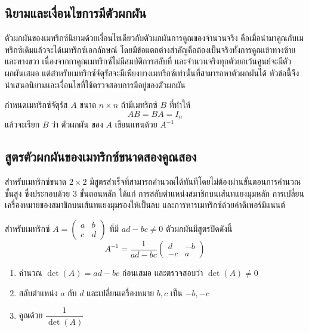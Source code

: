 \subsection{นิยามและเงื่อนไขการมีตัวผกผัน}
\label{ssec:inverse-def}
ตัวผกผันของเมทริกซ์นิยามด้วยเงื่อนไขเดียวกับตัวผกผันการคูณของจำนวนจริง คือเมื่อนำมาคูณกับเมทริกซ์เดิมแล้วจะได้เมทริกซ์เอกลักษณ์ โดยมีข้อแตกต่างสำคัญคือต้องเป็นจริงทั้งการคูณเข้าทางซ้ายและทางขวา เนื่องจากกาคูณเมทริกซ์ไม่มีสมบัติการสลับที่ และจำนวนจริงทุกตัวยกเว้นศูนย์จะมีตัวผกผันเสมอ แต่สำหรับเมทริกซ์จัตุรัสจะมีเพียงบางเมทริกซ์เท่านั้นที่สามารถหาตัวผกผันได้ หัวข้อนี้จึงนำเสนอนิยามและเงื่อนไขที่ใช้ตรวจสอบการมีอยู่ของตัวผกผัน

\begin{definition}
กำหนดเมทริกซ์จัตุรัส $A$ ขนาด $n \times n$ ถ้ามีเมทริกซ์ $B$ ที่ทำให้
\[ AB = BA = I_n \]
แล้วจะเรียก $B$ ว่า ตัวผกผัน ของ $A$ เขียนแทนด้วย $A^{-1}$
\end{definition}

\subsection{สูตรตัวผกผันของเมทริกซ์ขนาดสองคูณสอง}
\label{ssec:inverse-2x2}
สำหรับเมทริกซ์ขนาด $2 \times 2$ มีสูตรสำเร็จที่สามารถคำนวณได้ทันทีโดยไม่ต้องผ่านขั้นตอนการคำนวณชั้นสูง ซึ่งประกอบด้วย 3 ขั้นตอนหลัก ได้แก่ การสลับตำแหน่งสมาชิกบนเส้นทแยงมุมหลัก การเปลี่ยนเครื่องหมายของสมาชิกบนเส้นทแยงมุมรองให้เป็นลบ และการหารเมทริกซ์ด้วยค่าดีเทอร์มิแนนต์

\begin{prop}
สำหรับเมทริกซ์ $A = \begin{pmatrix} a & b \\ c & d \end{pmatrix}$ ที่มี $ad-bc \neq 0$ ตัวผกผันมีสูตรปิดดังนี้
\[
A^{-1} = \frac{1}{ad-bc} \begin{pmatrix} d & -b \\ -c & a \end{pmatrix}
\]
\end{prop}

\begin{rem}[ขั้นตอนการใช้สูตร]
\begin{enumerate}
    \item คำนวณ $\det(A) = ad - bc$ ก่อนเสมอ และตรวจสอบว่า $\det(A) \neq 0$
    \item สลับตำแหน่ง $a$ กับ $d$ และเปลี่ยนเครื่องหมาย $b, c$ เป็น $-b, -c$
    \item คูณด้วย $\dfrac{1}{\det(A)}$
\end{enumerate}
\end{rem}

